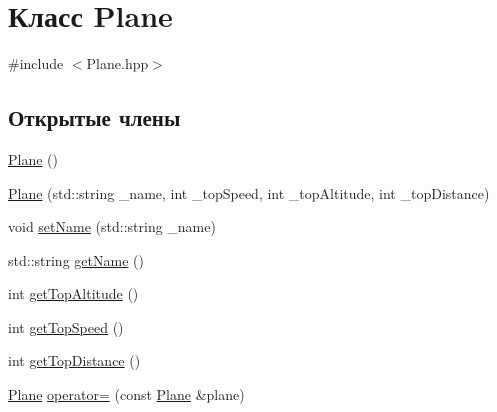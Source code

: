 \hypertarget{class_plane}{}\section{Класс Plane}
\label{class_plane}


{\ttfamily \#include $<$Plane.\+hpp$>$}

\subsection*{Открытые члены}
\begin{DoxyCompactItemize}
\item 
\hyperlink{class_plane_acac0d9c003e0ab10d07b146c3566a0c7}{Plane} ()
\item 
\hyperlink{class_plane_ae0d7335bda2507dc437b826e955e59aa}{Plane} (std\+::string \+\_\+name, int \+\_\+top\+Speed, int \+\_\+top\+Altitude, int \+\_\+top\+Distance)
\item 
void \hyperlink{class_plane_ac07289da0f9291cb6a42430f62a5d8df}{set\+Name} (std\+::string \+\_\+name)
\item 
std\+::string \hyperlink{class_plane_ae3132fd146e30797af90f38299c674c4}{get\+Name} ()
\item 
int \hyperlink{class_plane_acee1a482f8a73b1e25ff632f746b5d8a}{get\+Top\+Altitude} ()
\item 
int \hyperlink{class_plane_a0aba434973986eb6ab79bab2925e3d28}{get\+Top\+Speed} ()
\item 
int \hyperlink{class_plane_afa87ddc26eeef08b4562a5781c2b162b}{get\+Top\+Distance} ()
\item 
\hyperlink{class_plane}{Plane} \hyperlink{class_plane_af1fdeb8f1e7470175cd6e9da4c4b0a33}{operator=} (const \hyperlink{class_plane}{Plane} \&plane)
\end{DoxyCompactItemize}
